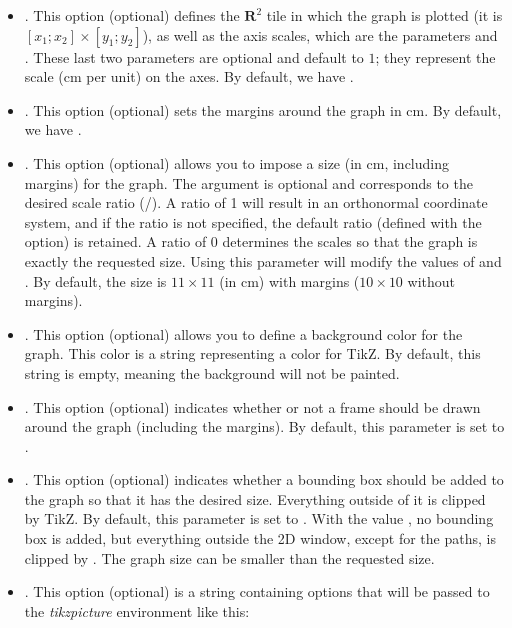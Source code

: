 \begin{itemize}
\item {}. This option (optional) defines the $\mathbf R^2$ tile in which the graph is plotted (it is $[x_1;x_2]\times[y_1;y_2]$), as well as the axis scales, which are the parameters  and . These last two parameters are optional and default to $1$; they represent the scale (cm per unit) on the axes.
 By default, we have .

\item {}. This option (optional) sets the margins around the graph in cm. By default, we have .

\item {}. This option (optional) allows you to impose a size (in cm, including margins) for the graph. The  argument is optional and corresponds to the desired scale ratio (/). A ratio of 1 will result in an orthonormal coordinate system, and if the ratio is not specified, the default ratio (defined with the  option) is retained. A ratio of $0$ determines the scales so that the graph is exactly the requested size. Using this parameter will modify the values ​​of  and . By default, the size is $11\times 11$ (in cm) with margins ($10\times 10$ without margins).

\item {}. This option (optional) allows you to define a background color for the graph. This color is a string representing a color for TikZ. By default, this string is empty, meaning the background will not be painted.

\item {}. This option (optional) indicates whether or not a frame should be drawn around the graph (including the margins). By default, this parameter is set to \false.

\item {}. This option (optional) indicates whether a bounding box should be added to the graph so that it has the desired size. Everything outside of it is clipped by TikZ. By default, this parameter is set to \true. With the value \false, no bounding box is added, but everything outside the 2D window, except for the paths, is clipped by \luadrawenv. The graph size can be smaller than the requested size.

\item {}. This option (optional) is a string containing options that will be passed to the \emph{tikzpicture} environment like this:
\begin{TeXcode}
\begin{tikzpicture}[line join=round <,pictureoptions>]
\end{TeXcode}
\end{itemize}

